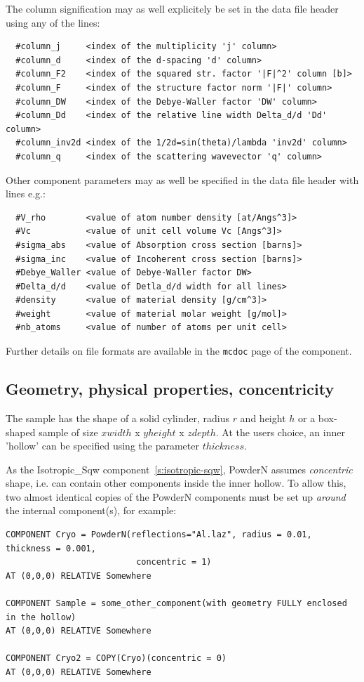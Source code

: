 The column signification may as well explicitely be set in the data file header using any of the lines:
\begin{verbatim}
  #column_j     <index of the multiplicity 'j' column>
  #column_d     <index of the d-spacing 'd' column>
  #column_F2    <index of the squared str. factor '|F|^2' column [b]>
  #column_F     <index of the structure factor norm '|F|' column>
  #column_DW    <index of the Debye-Waller factor 'DW' column>
  #column_Dd    <index of the relative line width Delta_d/d 'Dd' column>
  #column_inv2d <index of the 1/2d=sin(theta)/lambda 'inv2d' column>
  #column_q     <index of the scattering wavevector 'q' column>
\end{verbatim}

Other component parameters may as well be specified in the data file
header with lines e.g.:
\begin{verbatim}
  #V_rho        <value of atom number density [at/Angs^3]>
  #Vc           <value of unit cell volume Vc [Angs^3]>
  #sigma_abs    <value of Absorption cross section [barns]>
  #sigma_inc    <value of Incoherent cross section [barns]>
  #Debye_Waller <value of Debye-Waller factor DW>
  #Delta_d/d    <value of Detla_d/d width for all lines>
  #density      <value of material density [g/cm^3]>
  #weight       <value of material molar weight [g/mol]>
  #nb_atoms     <value of number of atoms per unit cell>
\end{verbatim}

Further details on file formats are available in the \verb+mcdoc+ page
of the component.

\subsection{Geometry, physical properties, concentricity}
The sample has the shape of a solid cylinder, radius $r$ and height $h$ or a box-shaped
sample of size $xwidth$ x $yheight$ x $zdepth$. At the users choice, an inner 'hollow' can be
specified using the parameter $thickness$. 


As the Isotropic\_Sqw component~\ref{s:isotropic-sqw}, PowderN assumes \emph{concentric} shape, i.e.
can contain other components inside the inner hollow. To allow this, two almost identical copies
of the PowderN components must be set up \emph{around} the internal component(s), for example:


\begin{verbatim}
COMPONENT Cryo = PowderN(reflections="Al.laz", radius = 0.01, thickness = 0.001,
                          concentric = 1)
AT (0,0,0) RELATIVE Somewhere

COMPONENT Sample = some_other_component(with geometry FULLY enclosed in the hollow)
AT (0,0,0) RELATIVE Somewhere

COMPONENT Cryo2 = COPY(Cryo)(concentric = 0)
AT (0,0,0) RELATIVE Somewhere
\end{verbatim}

